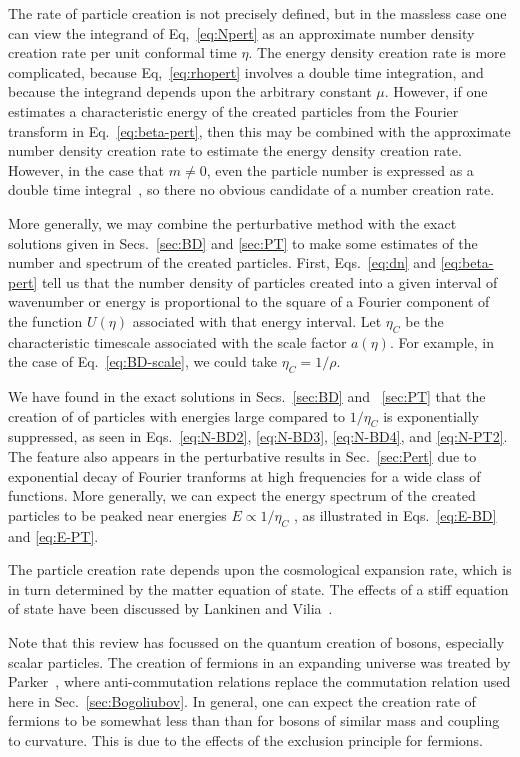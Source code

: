 \documentclass[12pt,onecolumn,eqsecnum,floats,aps,prd,floatfix,titlepage]{revtex4-2}
\begin{document}
The rate of particle creation is not precisely defined, but in the massless case one can  view the
integrand of Eq,~\eqref{eq:Npert} as an approximate number density creation rate per
unit conformal time $\eta$. The energy density creation rate is more complicated, because
Eq,~\eqref{eq:rhopert} involves a double time integration, and because the integrand depends
upon the arbitrary constant $\mu$. However, if one estimates a characteristic energy of the created 
particles from the Fourier transform in Eq.~\eqref{eq:beta-pert}, then this may be combined with
the  approximate number density creation rate to estimate the energy density creation rate.
However, in the case that $m \not= 0$, even the particle number is expressed as a double 
time integral~\cite{BD2}, so there no obvious candidate of a number creation rate.

More generally, we may combine the perturbative method with the exact solutions given in
Secs.~\ref{sec:BD} and \ref{sec:PT} to make some estimates of the number and spectrum
of the created particles. First, Eqs.~\eqref{eq:dn}  and \eqref{eq:beta-pert} tell us that the
number density of particles created into a given interval of wavenumber or energy is proportional
to the square of a Fourier component of the function $U(\eta)$ associated with that energy interval.
Let $\eta_C$ be the characteristic timescale associated with the scale factor $a(\eta)$. For example, in
the case of Eq.~\eqref{eq:BD-scale}, we could take $\eta_C = 1/\rho$. 

We have found in the exact solutions in Secs.~\ref{sec:BD} and ~\ref{sec:PT} that the creation of
of particles with energies large compared to $1/\eta_C$ is exponentially suppressed, as seen in 
Eqs.~\eqref{eq:N-BD2}, \eqref{eq:N-BD3}, \eqref{eq:N-BD4}, and \eqref{eq:N-PT2}. The feature
also appears in the perturbative results in Sec.~\ref{sec:Pert} due to exponential decay of Fourier
tranforms at high frequencies for a wide class of functions. More generally, we can expect the
energy spectrum of the created particles to be peaked near energies $E \propto 1/\eta_C$ , as 
illustrated in Eqs.~\eqref {eq:E-BD} and \eqref{eq:E-PT}. 

The particle creation rate depends upon the cosmological expansion rate, which is in turn determined
by the matter equation of state. The effects of a stiff equation of state have been discussed by
Lankinen and Vilia~\cite{Lankinen2017}.   

Note that this review has focussed on the quantum creation of bosons, especially scalar particles.
The creation of fermions in an expanding universe was treated by Parker~\cite{Parker71}, where
anti-commutation relations replace the commutation relation used here in Sec.~\ref{sec:Bogoliubov}.
In general, one can expect the creation rate of fermions to be somewhat less than than for bosons
of similar mass and coupling to curvature. This is due to the effects of the exclusion principle for
fermions.
\end{document}
